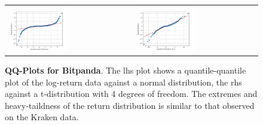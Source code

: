 \documentclass[english,11pt]{article}
\begin{document}
\begin{figure}[h]
    \center
    \begin{tabular}{ll}
    \includegraphics[width=0.5\textwidth]{qq_normal.png} &
    \includegraphics[width=0.5\textwidth]{qq_tdist.png} \\
    \end{tabular}
    \caption{\textbf{QQ-Plots for Bitpanda}. The lhs plot shows a quantile-quantile plot
    of the log-return data against a normal distribution, the rhs
    against a t-distribution with 4 degrees of freedom.
    The extremes and heavy-taildness of the return distribution is similar
    to that observed on the Kraken data.}\label{fig:qqplots2}
\end{figure}
\end{document}
